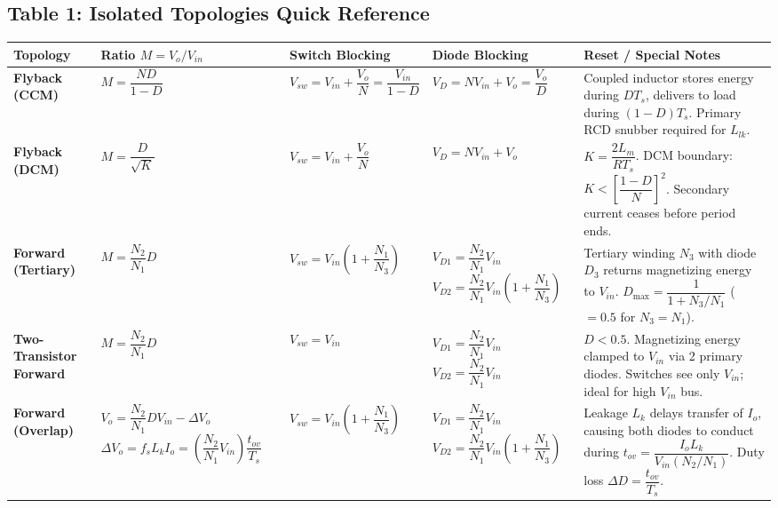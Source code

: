 \subsection{Table 1: Isolated Topologies Quick Reference}
\vspace{-6pt}
\begin{center}
\vspace{-4pt}
\footnotesize
\renewcommand{\arraystretch}{1.10}
\begin{tabularx}{\textwidth}{@{} >{\raggedright\arraybackslash}p{2.6cm} >{\raggedright\arraybackslash}p{3.2cm} >{\raggedright\arraybackslash}p{2.4cm} >{\raggedright\arraybackslash}p{2.8cm} >{\raggedright\arraybackslash}X @{}}
\toprule
\textbf{Topology} & \textbf{Ratio $M = V_o/V_{in}$} & \textbf{Switch Blocking} & \textbf{Diode Blocking} & \textbf{Reset / Special Notes} \\
\midrule
\textbf{Flyback (CCM)} &
$M = \dfrac{N D}{1-D}$ &
$V_{sw} = V_{in} + \dfrac{V_o}{N} = \dfrac{V_{in}}{1-D}$ &
$V_D = N V_{in} + V_o = \dfrac{V_o}{D}$ &
Coupled inductor stores energy during $D T_s$, delivers to load during $(1-D)T_s$. Primary RCD snubber required for $L_{lk}$. \\

\textbf{Flyback (DCM)} &
$M = \dfrac{D}{\sqrt{K}}$ &
$V_{sw} = V_{in} + \dfrac{V_o}{N}$ &
$V_D = N V_{in} + V_o$ &
$K = \dfrac{2L_m}{R T_s}$. DCM boundary: $K < \left[\dfrac{1-D}{N}\right]^2$. Secondary current ceases before period ends. \\

\textbf{Forward (Tertiary)} &
$M = \dfrac{N_2}{N_1} D$ &
$V_{sw} = V_{in}\left(1 + \dfrac{N_1}{N_3}\right)$ &
$V_{D1} = \dfrac{N_2}{N_1} V_{in}$ \newline
$V_{D2} = \dfrac{N_2}{N_1} V_{in}\left(1 + \dfrac{N_1}{N_3}\right)$ &
Tertiary winding $N_3$ with diode $D_3$ returns magnetizing energy to $V_{in}$. $D_{\max} = \dfrac{1}{1 + N_3/N_1}$ ($=0.5$ for $N_3=N_1$). \\

\textbf{Two-Transistor Forward} &
$M = \dfrac{N_2}{N_1} D$ &
$V_{sw} = V_{in}$ &
$V_{D1} = \dfrac{N_2}{N_1} V_{in}$ \newline
$V_{D2} = \dfrac{N_2}{N_1} V_{in}$ &
$D < 0.5$. Magnetizing energy clamped to $V_{in}$ via 2 primary diodes. Switches see only $V_{in}$; ideal for high $V_{in}$ bus. \\

\textbf{Forward (Overlap)} &
$V_o = \dfrac{N_2}{N_1} D V_{in} - \Delta V_o$ \newline
$\Delta V_o = f_s L_k I_o = \left(\dfrac{N_2}{N_1} V_{in}\right)\dfrac{t_{ov}}{T_s}$ &
$V_{sw} = V_{in}\left(1 + \dfrac{N_1}{N_3}\right)$ &
$V_{D1} = \dfrac{N_2}{N_1} V_{in}$ \newline
$V_{D2} = \dfrac{N_2}{N_1} V_{in}\left(1 + \dfrac{N_1}{N_3}\right)$ &
Leakage $L_k$ delays transfer of $I_o$, causing both diodes to conduct during $t_{ov} = \dfrac{I_o L_k}{V_{in}(N_2/N_1)}$. Duty loss $\Delta D = \dfrac{t_{ov}}{T_s}$. \\


\end{tabularx}
\end{center}

